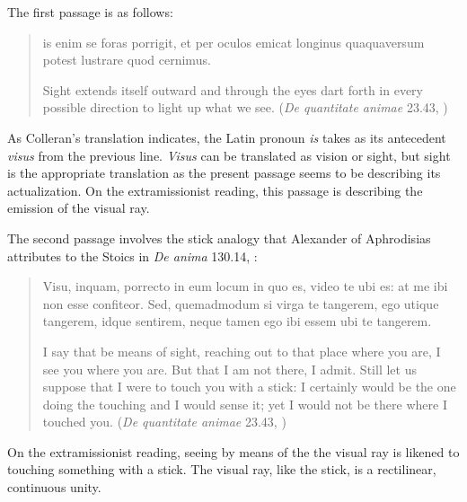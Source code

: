 \documentclass[12pt]{article}
\begin{document}
The first passage is as follows:
\begin{quote}
	is enim se foras porrigit, et per oculos emicat longinus quaquaversum potest lustrare quod cernimus. 
	
	Sight extends itself outward and through the eyes dart forth in every possible direction to light up what we see. (\emph{De quantitate animae} 23.43, \citealt[66]{Colleran:1949ys})
\end{quote}
As Colleran's translation indicates, the Latin pronoun \emph{is} takes as its antecedent \emph{visus} from the previous line. \emph{Visus} can be translated as vision or sight, but sight is the appropriate translation as the present passage seems to be describing its actualization. On the extramissionist reading, this passage is describing the emission of the visual ray.

The second passage involves the stick analogy that Alexander of Aphrodisias attributes to the Stoics in \emph{De anima} 130.14, \citep{Bergeron:2008aa}:
\begin{quote}
	Visu, inquam, porrecto in eum locum in quo es, video te ubi es: at me ibi non esse confiteor. Sed, quemadmodum si virga te tangerem, ego utique tangerem, idque sentirem, neque tamen ego ibi essem ubi te tangerem. 
	
	I say that be means of sight, reaching out to that place where you are, I see you where you are. But that I am not there, I admit. Still let us suppose that I were to touch you with a stick: I certainly would be the one doing the touching and I would sense it; yet I would not be there where I touched you. (\emph{De quantitate animae} 23.43, \citealt[66]{Colleran:1949ys}) 
\end{quote}
On the extramissionist reading, seeing by means of the the visual ray is likened to touching something with a stick. The visual ray, like the stick, is a rectilinear, continuous unity.

\end{document}
